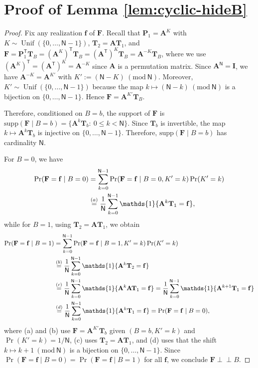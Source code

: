\documentclass[onecolumn]{IEEEtran} %
\newcommand{\bA}{\mathbf A}
\newcommand{\bP}{\mathbf P}
\newcommand{\bF}{\mathbf F}
\newcommand{\bI}{\mathbf I}
\newcommand{\1}{\mathbbm{1}}
\theoremstyle{boldremark}
\newcommand{\bT}{\mathbf{T}}
\DeclareMathOperator{\Unif}{Unif}
\newcommand{\pperp}{\mathrel{\perp\!\!\!\perp}}
\begin{document}
\section{Proof of Lemma \ref{lem:cyclic-hideB}}\label{APP_proof_cyclic-hideB}
\begin{proof}
Fix any realization $\mathbf f$ of $\bF$. Recall that $\bP_1=\bA^{K}$ with
$K\sim\Unif(\{0,\dots,\textsf{N}-1\})$, $\bT_2=\bA\bT_1$, and
$\bF=\bP_1^{\mathsf T}\bT_B=(\bA^{K})^{\mathsf T}\bT_B=(\bA^{\mathsf T})^{K}\bT_B=\bA^{-K}\bT_B$,
where we use $(\bA^{K})^{\mathsf T}=(\bA^{\mathsf T})^{K}=\bA^{-K}$ since $\bA$ is a permutation matrix.
Since $\bA^{\textsf{N}}=\bI$, we have $\bA^{-K}=\bA^{K'}$ with
$K':=(\textsf{N}-K)\ (\mathrm{mod}\ \textsf{N})$. Moreover, $K'\sim\Unif(\{0,\dots,\textsf{N}-1\})$
because the map $k\mapsto (\textsf{N}-k)\ (\mathrm{mod}\ \textsf{N})$ is a bijection on
$\{0,\dots,\textsf{N}-1\}$. Hence $\bF=\bA^{K'}\bT_B$.

Therefore, conditioned on $B=b$, the support of $\bF$ is
$\mathrm{supp}(\bF\mid B=b)=\{\bA^{k}\bT_b:\ 0\le k<\textsf{N}\}$.
Since $\bT_b$ is invertible, the map $k\mapsto \bA^{k}\bT_b$ is injective on
$\{0,\dots,\textsf{N}-1\}$. Therefore, $\mathrm{supp}(\bF\mid B=b)$ has cardinality $\textsf{N}$.

For $B=0$, we have
\begin{align}
\Pr(\bF=\mathbf f\mid B=0)
&=\sum_{k=0}^{\textsf{N}-1}\Pr(\bF=\mathbf f\mid B=0,K'=k)\Pr(K'=k)\notag\\
&\stackrel{(a)}{=}\frac{1}{\textsf{N}}\sum_{k=0}^{\textsf{N}-1}\mathds{1}\{\bA^{k}\bT_1=\mathbf f\},
\label{eq:cyclic-hideB-b0}
\end{align}
while for $B=1$, using $\bT_2=\bA\bT_1$, we obtain
\begin{align}
\Pr(\bF=\mathbf f\mid B=1)
&=\sum_{k=0}^{\textsf{N}-1}\Pr(\bF=\mathbf f\mid B=1,K'=k)\Pr(K'=k)\notag\\
&\stackrel{(b)}{=}\frac{1}{\textsf{N}}\sum_{k=0}^{\textsf{N}-1}\mathds{1}\{\bA^{k}\bT_2=\mathbf f\}\notag\\
&\stackrel{(c)}{=}\frac{1}{\textsf{N}}\sum_{k=0}^{\textsf{N}-1}\mathds{1}\{\bA^{k}\bA\bT_1=\mathbf f\}
=\frac{1}{\textsf{N}}\sum_{k=0}^{\textsf{N}-1}\mathds{1}\{\bA^{k+1}\bT_1=\mathbf f\}\notag\\
&\stackrel{(d)}{=}\frac{1}{\textsf{N}}\sum_{k=0}^{\textsf{N}-1}\mathds{1}\{\bA^{k}\bT_1=\mathbf f\}
=\Pr(\bF=\mathbf f\mid B=0),
\label{eq:cyclic-hideB-b1}
\end{align}
where (a) and (b) use $\bF=\bA^{K'}\bT_b$ given $(B=b,K'=k)$ and $\Pr(K'=k)=1/\textsf{N}$,
(c) uses $\bT_2=\bA\bT_1$, and (d) uses that the shift $k\mapsto k+1\ (\mathrm{mod}\ \textsf{N})$
is a bijection on $\{0,\dots,\textsf{N}-1\}$.
Since $\Pr(\bF=\mathbf f\mid B=0)=\Pr(\bF=\mathbf f\mid B=1)$ for all $\mathbf f$,
we conclude $\bF\pperp B$.
\end{proof}
\end{document}
